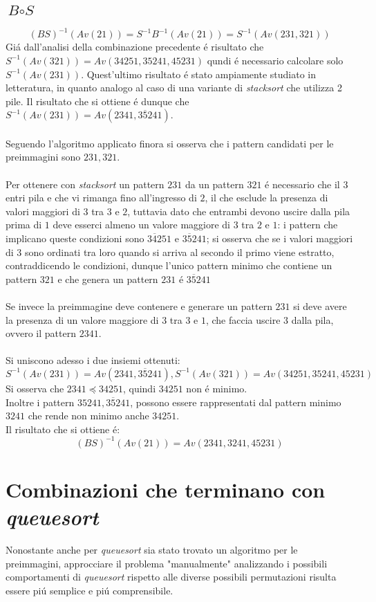 \subsection*{$\textit{B}\circ\textit{S}$}$$(BS)^{-1}(Av(21))=S^{-1}B^{-1}(Av(21))=S^{-1}(Av(231,321))$$
Gi\'a dall'analisi della combinazione precedente \'e risultato che $S^{-1}(Av(321))=Av(34251, 35241, 45231)$ qundi \'e necessario calcolare solo $S^{-1}(Av(231))$. Quest'ultimo risultato \'e stato ampiamente studiato in letteratura, in quanto analogo al caso di una variante di \textit{stacksort} che utilizza 2 pile. Il risultato che si ottiene \'e dunque che $S^{-1}(Av(231))=Av(2341, 3\overline{5}241)$\cite{claesson2012sorting}.\\\\
Seguendo l'algoritmo applicato finora si osserva che i pattern candidati per le preimmagini sono $231,321$.\\\\
Per ottenere con \textit{stacksort} un pattern $231$ da un pattern $321$ \'e necessario che il $3$ entri pila e che vi rimanga fino all'ingresso di $2$, il che esclude la presenza di valori maggiori di $3$ tra $3$ e $2$, tuttavia dato che entrambi devono uscire dalla pila prima di $1$ deve esserci almeno un valore maggiore di $3$ tra $2$ e $1$: i pattern che implicano queste condizioni sono $3\overline{4}251$ e $3\overline{5}241$; si osserva che se i valori maggiori di $3$ sono ordinati tra loro quando si arriva al secondo il primo viene estratto, contraddicendo le condizioni, dunque l'unico pattern minimo che contiene un pattern $321$ e che genera un pattern $231$ \'e $3\overline{5}241$ \\
\\Se invece la preimmagine deve contenere e generare un pattern $231$ si deve avere la presenza di un valore maggiore di $3$ tra $3$ e $1$, che faccia uscire $3$ dalla pila, ovvero il pattern $2341$.\\\\
Si uniscono adesso i due insiemi ottenuti:
$$S^{-1}(Av(231))=Av(2341,3\overline{5}241), S^{-1}(Av(321))=Av(34251, 35241, 45231)$$
Si osserva che $2341\preceq 34251$, quindi $34251$ non \'e minimo.\\
Inoltre i pattern $35241, 3\overline{5}241$, possono essere rappresentati dal pattern minimo $3241$ che rende non minimo anche $34251$.\\Il risultato che si ottiene \'e:$$(BS)^{-1}(Av(21))=Av(2341,3241,45231)$$
\section*{Combinazioni che terminano con \textit{queuesort}}
Nonostante anche per \textit{queuesort} sia stato trovato un algoritmo per le preimmagini\cite{magnusson2013sorting}, approcciare il problema "manualmente" analizzando i possibili comportamenti di \textit{queuesort} rispetto alle diverse possibili permutazioni risulta essere pi\'u semplice e pi\'u comprensibile.
